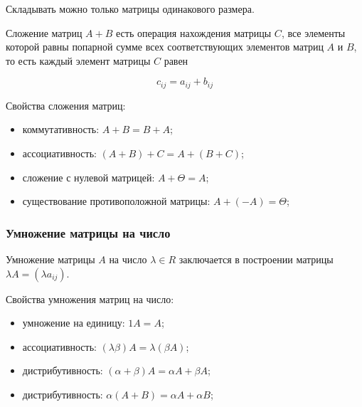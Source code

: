 \documentclass{article}
\begin{document}

Складывать можно только матрицы одинакового размера.

Сложение матриц  $A+B$ есть операция нахождения матрицы $C$, все элементы которой равны попарной сумме всех соответствующих элементов матриц $A$ и $B$, то есть каждый элемент матрицы $C$ равен

      $$ c_{ij} = a_{ij} + b_{ij}$$

Свойства сложения матриц:
\begin{itemize}
    \item коммутативность: $A+B = B+A$;
    \item ассоциативность: $(A+B)+C =A+(B+C)$;
    \item сложение с нулевой матрицей: $A + \Theta = A$;
    \item существование противоположной матрицы: $A + (-A) = \Theta$;
\end{itemize}

\subsubsection*{Умножение матрицы на число}

Умножение матрицы $A$ на число $\lambda \in R$ заключается в построении матрицы $\lambda A = ( \lambda a_{ij} )$.



Свойства умножения матриц на число:
\begin{itemize}
    \item умножение на единицу: $1A = A$;
    \item ассоциативность: $(\lambda\beta)A = \lambda(\beta A)$;
    \item дистрибутивность: $(\alpha+\beta)A = \alpha A + \beta A$;
    \item дистрибутивность: $\alpha(A+B) = \alpha A + \alpha B$;
\end{itemize}
\end{document}
